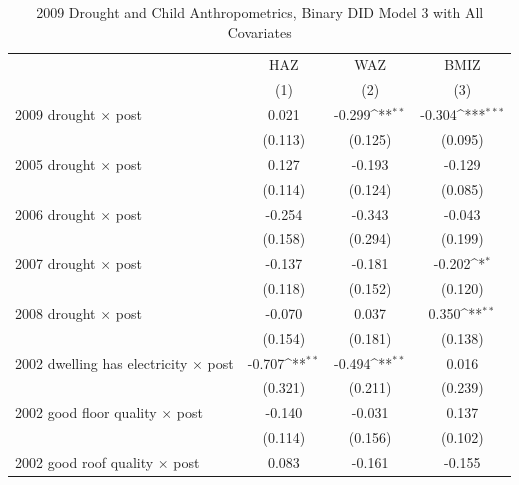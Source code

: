 \documentclass[12pt]{article}
\def\sym#1{\ifmmode^{#1}\else\(^{#1}\)\fi}
\begin{document}
\begingroup
\footnotesize
\renewcommand{\arraystretch}{0.86}
\setlength{\tabcolsep}{4pt}
\setlength{\LTcapwidth}{\textwidth}
\begin{longtable}{p{}ccc}
\caption{2009 Drought and Child Anthropometrics, Binary DID Model 3 with All Covariates}\\
\toprule
 & HAZ & WAZ & BMIZ\\
            &\multicolumn{1}{c}{(1)}         &\multicolumn{1}{c}{(2)}         &\multicolumn{1}{c}{(3)}         \\
\midrule
2009 drought \ensuremath{\times} post&       0.021         &      -0.299\sym{**} &      -0.304\sym{***}\\
            &     (0.113)         &     (0.125)         &     (0.095)         \\
2005 drought \ensuremath{\times} post&       0.127         &      -0.193         &      -0.129         \\
            &     (0.114)         &     (0.124)         &     (0.085)         \\
2006 drought \ensuremath{\times} post&      -0.254         &      -0.343         &      -0.043         \\
            &     (0.158)         &     (0.294)         &     (0.199)         \\
2007 drought \ensuremath{\times} post&      -0.137         &      -0.181         &      -0.202\sym{*}  \\
            &     (0.118)         &     (0.152)         &     (0.120)         \\
2008 drought \ensuremath{\times} post&      -0.070         &       0.037         &       0.350\sym{**} \\
            &     (0.154)         &     (0.181)         &     (0.138)         \\
2002 dwelling has electricity \ensuremath{\times} post&      -0.707\sym{**} &      -0.494\sym{**} &       0.016         \\
            &     (0.321)         &     (0.211)         &     (0.239)         \\
2002 good floor quality \ensuremath{\times} post&      -0.140         &      -0.031         &       0.137         \\
            &     (0.114)         &     (0.156)         &     (0.102)         \\
2002 good roof quality \ensuremath{\times} post&       0.083         &      -0.161         &      -0.155         \\

\end{longtable}
\end{document}
